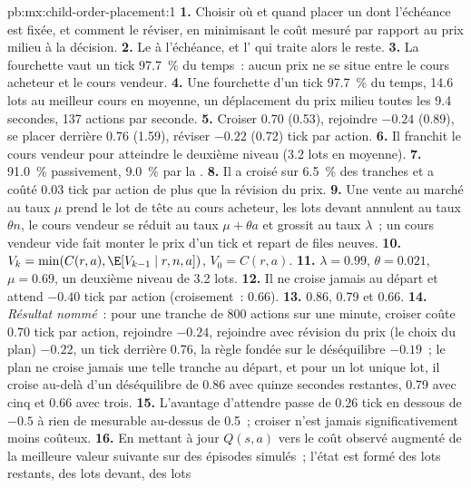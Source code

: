 \begin{solution}{pb:mx:child-order-placement:1}
\textbf{1.} Choisir où et quand placer un  dont l'échéance est fixée, et comment le réviser, en minimisant le coût mesuré par rapport au prix milieu à la décision.
\textbf{2.} Le  à l'échéance, et l' qui traite alors le reste.
\textbf{3.} La fourchette vaut un tick 97.7~\% du temps~: aucun prix ne se situe entre le cours acheteur et le cours vendeur.
\textbf{4.} Une fourchette d'un tick 97.7~\% du temps, 14.6 lots au meilleur cours en moyenne, un déplacement du prix milieu toutes les 9.4 secondes, 137 actions par seconde.
\textbf{5.} Croiser 0.70 (0.53), rejoindre $-0.24$ (0.89), se placer derrière 0.76 (1.59), réviser $-0.22$ (0.72) tick par action.
\textbf{6.} Il franchit le cours vendeur pour atteindre le deuxième niveau (3.2 lots en moyenne).
\textbf{7.} 91.0~\% passivement, 9.0~\% par la .
\textbf{8.} Il a croisé sur 6.5~\% des tranches et a coûté 0.03 tick par action de plus que la révision du prix.
\textbf{9.} Une vente au marché au taux $\mu$ prend le lot de tête au cours acheteur, les lots devant annulent au taux $\theta n$, le cours vendeur se réduit au taux $\mu+\theta a$ et grossit au taux
$\lambda$~; un cours vendeur vide fait monter le prix d'un tick et repart de files neuves.
\textbf{10.} $V_k=\min(C(r,a),\E[V_{k-1}\mid r,n,a])$, $V_0=C(r,a)$.
\textbf{11.} $\lambda=0.99$, $\theta=0.021$, $\mu=0.69$, un deuxième niveau de 3.2 lots.
\textbf{12.} Il ne croise jamais au départ et attend $-0.40$ tick par action (croisement~: 0.66).
\textbf{13.} 0.86, 0.79 et 0.66.
\textbf{14.} \emph{Résultat nommé}~: pour une tranche de 800 actions sur une minute, croiser coûte 0.70 tick par action, rejoindre $-0.24$, rejoindre avec révision du prix
(le choix du plan) $-0.22$, un tick derrière 0.76, la règle fondée sur le déséquilibre $-0.19$~; le plan ne croise jamais une telle tranche au départ, et pour un lot unique
lot, il croise au-delà d'un déséquilibre de 0.86 avec quinze secondes restantes, 0.79 avec cinq et 0.66 avec trois.
\textbf{15.} L'avantage d'attendre passe de 0.26 tick en dessous de $-0.5$ à rien de mesurable au-dessus de 0.5~; croiser n'est jamais significativement moins coûteux.
\textbf{16.} En mettant à jour $Q(s,a)$ vers le coût observé augmenté de la meilleure valeur suivante sur des épisodes simulés~; l'état est formé des lots restants, des lots devant, des lots

\end{solution}
